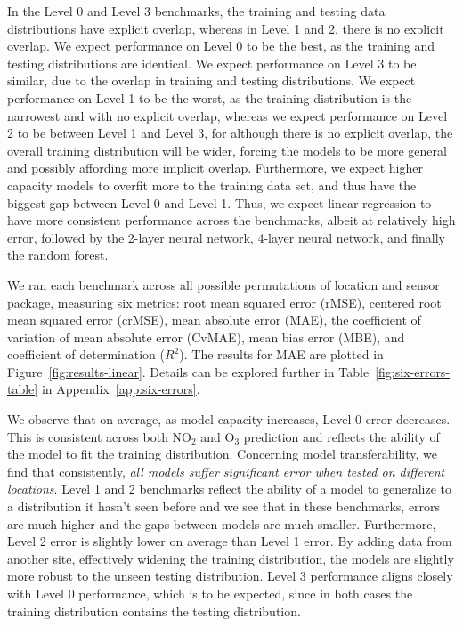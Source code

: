 \documentclass[journal abbreviation, manuscript]{copernicus}
\newcommand{\textus}[1]{$_{\text{#1}}$}
\begin{document}
In the Level 0 and Level 3 benchmarks, the training and testing data distributions have explicit overlap, whereas in Level 1 and 2, there is no explicit overlap. We expect performance on Level 0 to be the best, as the training and testing distributions are identical.  We expect performance on Level 3 to be similar, due to the overlap in training and testing distributions. We expect performance on Level 1 to be the worst, as the training distribution is the narrowest and with no explicit overlap, whereas we expect performance on Level 2 to be between Level 1 and Level 3, for although there is no explicit overlap, the overall training distribution will be wider, forcing the models to be more general and possibly affording more implicit overlap.  Furthermore, we expect higher capacity models to overfit more to the training data set, and thus have the biggest gap between Level 0 and Level 1. Thus, we expect linear regression to have more consistent performance across the benchmarks, albeit at relatively high error, followed by the 2-layer neural network, 4-layer neural network, and finally the random forest.

We ran each benchmark across all possible permutations of location and sensor package, measuring six metrics: root mean squared error (rMSE), centered root mean squared error (crMSE), mean absolute error (MAE), the coefficient of variation of mean absolute error (CvMAE), mean bias error (MBE), and coefficient of determination ($R^2$). The results for MAE are plotted in Figure~\ref{fig:results-linear}.  Details can be explored further in Table~\ref{fig:six-errors-table} in Appendix~\ref{app:six-errors}.

We observe that on average, as model capacity increases, Level 0 error decreases. This is consistent across both NO\textus{2} and O\textus{3} prediction and reflects the ability of the model to fit the training distribution. Concerning model transferability, we find that consistently, \emph{all models suffer significant error when tested on different locations}. Level 1 and 2 benchmarks reflect the ability of a model to generalize to a distribution it hasn't seen before and we see that in these benchmarks, errors are much higher and the gaps between models are much smaller. Furthermore, Level 2 error is slightly lower on average than Level 1 error. By adding data from another site, effectively widening the training distribution, the models are slightly more robust to the unseen testing distribution. Level 3 performance aligns closely with Level 0 performance, which is to be expected, since in both cases the training distribution contains the testing distribution.
\end{document}
